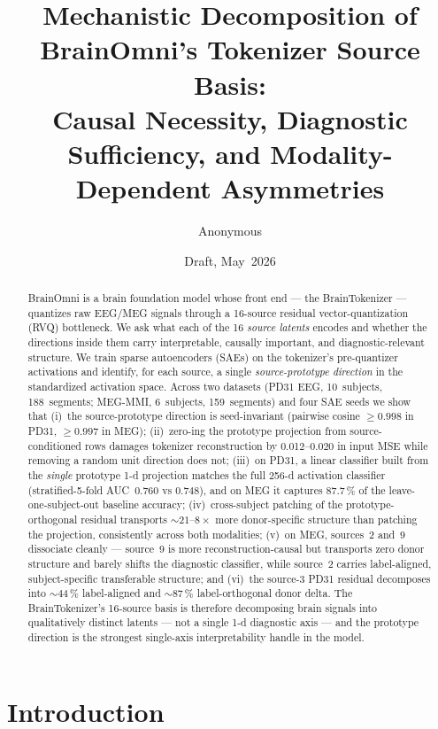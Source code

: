 \documentclass[11pt]{article}
\title{\textbf{Mechanistic Decomposition of BrainOmni's Tokenizer Source Basis:\\
Causal Necessity, Diagnostic Sufficiency, and Modality-Dependent Asymmetries}}
\author{Anonymous}
\date{Draft, May~2026}
\begin{document}
\maketitle

\begin{abstract}
\noindent
BrainOmni is a brain foundation model whose front end --- the BrainTokenizer ---
quantizes raw EEG/MEG signals through a 16-source residual vector-quantization (RVQ)
bottleneck. We ask what each of the 16 \emph{source latents} encodes and whether the
directions inside them carry interpretable, causally important, and diagnostic-relevant
structure. We train sparse autoencoders (SAEs) on the tokenizer's pre-quantizer
activations and identify, for each source, a single \emph{source-prototype direction}
in the standardized activation space.  Across two datasets (PD31 EEG, 10~subjects,
188~segments; MEG-MMI, 6~subjects, 159~segments) and four SAE seeds we show that
(i)~the source-prototype direction is seed-invariant (pairwise cosine
$\geq 0.998$ in PD31, $\geq 0.997$ in MEG);
(ii)~zero-ing the prototype projection from source-conditioned rows damages tokenizer
reconstruction by 0.012--0.020 in input MSE while removing a random unit direction
does not;
(iii)~on PD31, a linear classifier built from the \emph{single} prototype 1-d
projection matches the full 256-d activation classifier (stratified-5-fold
AUC~$0.760$ vs $0.748$), and on MEG it captures 87.7\,\% of the
leave-one-subject-out baseline accuracy;
(iv)~cross-subject patching of the prototype-orthogonal residual transports
$\sim 21$--$8\times$ more donor-specific structure than patching the projection,
consistently across both modalities;
(v)~on MEG, sources~2 and~9 dissociate cleanly --- source~9 is more
reconstruction-causal but transports zero donor structure and barely shifts the
diagnostic classifier, while source~2 carries label-aligned, subject-specific
transferable structure; and
(vi)~the source-3 PD31 residual decomposes into $\sim 44\,\%$ label-aligned and
$\sim 87\,\%$ label-orthogonal donor delta.
The BrainTokenizer's 16-source basis is therefore decomposing brain signals into
qualitatively distinct latents --- not a single 1-d diagnostic axis --- and the
prototype direction is the strongest single-axis interpretability handle in the model.
\end{abstract}

\section{Introduction}\label{sec:intro}
\end{document}
